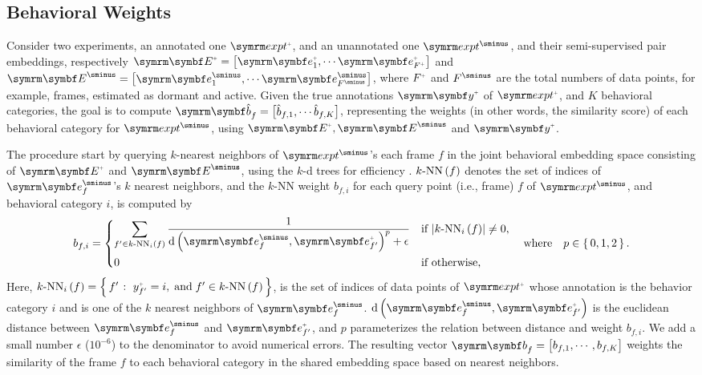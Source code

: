 \subsection{Behavioral Weights}\label{section:behavioral-weights}
Consider two experiments, an annotated one $\exptAnn$, and an unannotated one $\exptUnann$, and their semi-supervised pair embeddings, respectively $\Ann{\V{E}}=\qmatrix{\Ann{\V{e}}_1, \cdots \Ann{\V{e}_{\Ann{F}}}}$ and $\Unann{\V{E}}=\qmatrix{\Unann{\V{e}}_1, \cdots \Unann{\V{e}}_{\Unann{F}}}$, where $\Ann{F}$ and $\Unann{F}$ are the total numbers of data points, for example, frames, estimated as dormant and active.
Given the true annotations $\Ann{\V{y}}$ of $\exptAnn$, and $K$ behavioral categories, the goal is to compute $\V{\hat{b}}_f=\qmatrix{\hat{b}_{f,1}, \cdots \hat{b}_{f,K}}$, representing the weights (in other words, the similarity score) of each behavioral category for $\exptUnann$, using $\Ann{\V{E}}, \Unann{\V{E}}$ and $\Ann{\V{y}}$.

The procedure start by querying $k$-nearest neighbors of $\exptUnann$'s each frame $f$ in the joint behavioral embedding space consisting of $\Ann{\V{E}}$ and $\Unann{\V{E}}$, using the $k$-d trees for efficiency \citep{bentley_multidimensional_1975}. ${k\mathrm{\textnormal{-}NN}} \left( f \right)$ denotes the set of indices of $\Unann{\V{e}}_f$'s $k$ nearest neighbors, and the $k$-NN weight $b_{f,i}$ for each query point (i.e., frame) $f$ of $\exptUnann$, and behavioral category $i$, is computed by
\begin{equation}
	b_{f,i} = \begin{dcases}
		\sum_{f^\prime \in \NNi{k}{i}{f}}\frac{1}{\dist{\Unann{\V{e}}_f}{\Ann{\V{e}}_{f^\prime}}^p + \epsilon} & \textnormal{if } \card{\NNi{k}{i}{f}} \neq 0, \\
		0                                                                                                      & \textnormal{if otherwise},
	\end{dcases} \qbwhere p \in \set{0,1,2}.
\end{equation}
Here, $\NNi{k}{i}{f}=\Set{f^\prime}{\Ann{y}_{f^\prime}=i, \dband f^\prime \in \NN{k}{f}}$, is the set of indices of data points of $\exptAnn$ whose annotation is the behavior category $i$ and is one of the $k$ nearest neighbors of $\Unann{\V{e}}_f$.
$\dist{\Unann{\V{e}}_f}{\Ann{\V{e}}_{f^\prime}}$ is the euclidean distance between $\Unann{\V{e}}_f$ and $\Ann{\V{e}}_{f^\prime}$, and $p$ parameterizes the relation between distance and weight $b_{f,i}$.
We add a small number $\epsilon$ ($10^{{-}6}$) to the denominator to avoid numerical errors.
The resulting vector $\V{b}_f = \qmatrix{b_{f,1}, \cdots, b_{f,K}}$ weights the similarity of the frame $f$ to each behavioral category in the shared embedding space based on nearest neighbors.


